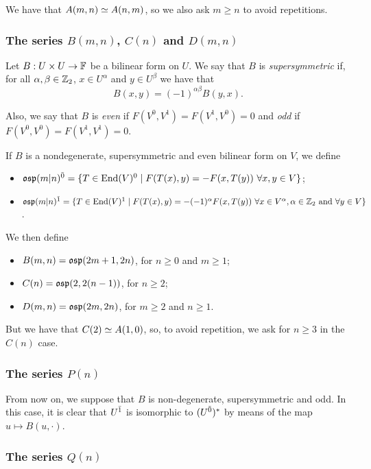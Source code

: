 We have that $A(m,n)\simeq A(n,m)$, so we also ask $m\geq n$ to avoid repetitions.

\subsubsection{The series $B(m,n)$, $C(n)$ and $D(m,n)$}

Let $B:U\times U \rightarrow \mathbb{F}$ be a bilinear form on $U$. We say that $B$ is \emph{supersymmetric} if, for all $\alpha,\beta\in\mathbb{Z}_{2}$, $x\in U^{\alpha}$ and $y\in U^{\beta}$ we have that
\[B(x,y) = (-1)^{\alpha\beta}B(y,x).\]

Also, we say that $B$ is \emph{even} if $F(V^0,V^1) = F(V^1,V^0)=0$ and \emph{odd} if $F(V^0,V^0) = F(V^1,V^1)=0$.

If $B$ is a nondegenerate, supersymmetric and even bilinear form on $V$, we define

\begin{itemize}
	\item $\mathfrak{osp}(m|n)^{\bar0} = \{T\in \operatorname{End} (V)^{0} \mid F(T(x),y) = - F(x,T   (y))\,\, \forall x,y\in V\}$;
	\item $\mathfrak{osp}(m|n)^{\bar1} = \{T\in \operatorname{End} (V)^{1} \mid F(T(x),y) = -(-1)^{\alpha} F(x,T(y))
		      \,\, \forall x\in V^{\alpha}, \alpha\in\mathbb{Z}_2 \text{ and } \forall y\in V\}$.
\end{itemize}

We then define

\begin{itemize}
	\item $B(m,n) = \mathfrak{osp}(2m+1,2n)$, for $n\geq 0$ and $m\geq 1$;
	\item $C(n) = \mathfrak{osp}(2, 2(n-1))$, for $n\geq 2$;
	\item $D(m,n) = \mathfrak{osp}(2m,2n)$, for $m\geq 2$ and $n\geq 1$.
\end{itemize}
But we have that $C(2)\simeq A(1,0)$, so, to avoid repetition, we ask for $n\geq 3$ in the $C(n)$ case.

\subsubsection{The series $P(n)$}
From now on, we suppose that $B$ is non-degenerate, supersymmetric and odd. In this case, it is clear that $U^{\bar1}$ is isomorphic to $(U^{\bar0})^*$ by means of the map $u \mapsto B(u, \cdot)$. %

\subsubsection{The series $Q(n)$}

